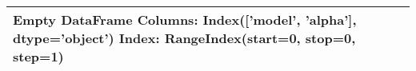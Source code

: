 \begin{tabular}{ll}
\toprule
Empty DataFrame
Columns: Index(['model', 'alpha'], dtype='object')
Index: RangeIndex(start=0, stop=0, step=1) \\
\bottomrule
\end{tabular}

